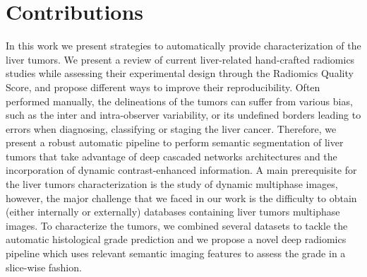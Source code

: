 



\section*{Contributions}
\label{sec:IntroContributions}

In this work we present strategies to automatically provide characterization of the liver tumors.
We present a review of current liver-related hand-crafted radiomics studies while assessing their experimental design through the Radiomics Quality Score, and propose different ways to improve their reproducibility.
Often performed manually, the delineations of the tumors can suffer from various bias, such as the inter and intra-observer variability, or its undefined borders leading to errors when diagnosing, classifying or staging the liver cancer. Therefore, we present a robust automatic pipeline to perform semantic segmentation of liver tumors that take advantage of deep cascaded networks architectures and the incorporation of dynamic contrast-enhanced information. A main prerequisite for the liver tumors characterization is the study of dynamic multiphase images, however, the major challenge that we faced in our work is the difficulty to obtain (either internally or externally) databases containing liver tumors multiphase images. To characterize the tumors, we combined several datasets to tackle the automatic histological grade prediction and we propose a novel deep radiomics pipeline which uses relevant semantic imaging features to assess the grade in a slice-wise fashion.\\


